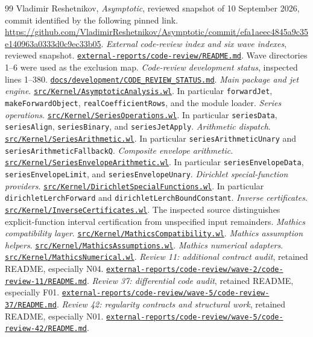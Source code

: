 \documentclass[11pt,a4paper]{article}
\newcommand{\reposource}[1]{\href{https://github.com/VladimirReshetnikov/Asymptotic/blob/efa1aeec4845a9c35e140963a0333d0c9ec33b05/#1}{\nolinkurl{#1}}}
\begin{document}
\begin{thebibliography}{99}
\small
{} Vladimir Reshetnikov, \emph{Asymptotic}, reviewed snapshot of 10 September 2026, commit identified by the following pinned link. \url{https://github.com/VladimirReshetnikov/Asymptotic/commit/efa1aeec4845a9c35e140963a0333d0c9ec33b05}.
 \emph{External code-review index and six wave indexes}, reviewed snapshot. \reposource{external-reports/code-review/README.md}. Wave directories 1--6 were used as the exclusion map.
 \emph{Code-review development status}, inspected lines 1--380. \reposource{docs/development/CODE_REVIEW_STATUS.md}.
 \emph{Main package and jet engine}. \reposource{src/Kernel/AsymptoticAnalysis.wl}. In particular \texttt{forwardJet}, \texttt{makeForwardObject}, \texttt{realCoefficientRows}, and the module loader.
 \emph{Series operations}. \reposource{src/Kernel/SeriesOperations.wl}. In particular \texttt{seriesData}, \texttt{seriesAlign}, \texttt{seriesBinary}, and \texttt{seriesJetApply}.
 \emph{Arithmetic dispatch}. \reposource{src/Kernel/SeriesArithmetic.wl}. In particular \texttt{seriesArithmeticUnary} and \texttt{seriesArithmeticFallbackQ}.
 \emph{Composite envelope arithmetic}. \reposource{src/Kernel/SeriesEnvelopeArithmetic.wl}. In particular \texttt{seriesEnvelopeData}, \texttt{seriesEnvelopeLimit}, and \texttt{seriesEnvelopeUnary}.
 \emph{Dirichlet special-function providers}. \reposource{src/Kernel/DirichletSpecialFunctions.wl}. In particular \texttt{dirichletLerchForward} and \texttt{dirichletLerchBoundConstant}.
 \emph{Inverse certificates}. \reposource{src/Kernel/InverseCertificates.wl}. The inspected source distinguishes explicit-function interval certification from unspecified input remainders.
 \emph{Mathics compatibility layer}. \reposource{src/Kernel/MathicsCompatibility.wl}.
 \emph{Mathics assumption helpers}. \reposource{src/Kernel/MathicsAssumptions.wl}.
 \emph{Mathics numerical adapters}. \reposource{src/Kernel/MathicsNumerical.wl}.
 \emph{Review 11: additional contract audit}, retained README, especially N04. \reposource{external-reports/code-review/wave-2/code-review-11/README.md}.
 \emph{Review 37: differential code audit}, retained README, especially F01. \reposource{external-reports/code-review/wave-5/code-review-37/README.md}.
 \emph{Review 42: regularity contracts and structural work}, retained README, especially N01. \reposource{external-reports/code-review/wave-5/code-review-42/README.md}.

\end{thebibliography}
\end{document}
